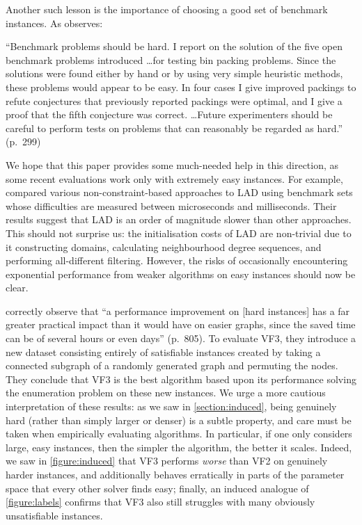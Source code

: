 \documentclass[twoside,11pt]{article}
\begin{document}
Another such lesson is the importance of choosing a good set of benchmark instances. As
 observes:

\begin{displayquote}
    ``Benchmark problems should be hard. I report on the solution of the five open benchmark
    problems introduced \ldots for testing bin packing problems. Since the solutions were found
    either by hand or by using very simple heuristic methods, these problems would appear to be
    easy. In four cases I give improved packings to refute conjectures that previously reported
    packings were optimal, and I give a proof that the fifth conjecture was correct. \ldots Future
    experimenters should be careful to perform tests on problems that can reasonably be regarded as
    hard.'' (p.\ 299)
\end{displayquote}

We hope that this paper provides some much-needed help in this direction, as some recent
evaluations work only with extremely easy instances. For example, 
compared various non-constraint-based approaches to LAD using benchmark sets whose
difficulties are measured between microseconds and milliseconds. Their results suggest that LAD is
an order of magnitude slower than other approaches. This should not surprise us: the initialisation
costs of LAD are non-trivial due to it constructing domains, calculating neighbourhood degree
sequences, and performing all-different filtering. However, the risks of occasionally encountering
exponential performance from weaker algorithms on easy instances should now be clear.

 correctly observe that ``a performance improvement on [hard instances] has a
far greater practical impact than it would have on easier graphs, since the saved time can be of
several hours or even days'' (p.\ 805). To evaluate VF3, they introduce a new dataset consisting
entirely of satisfiable instances created by taking a connected subgraph of a randomly generated
graph and permuting the nodes. They conclude that VF3 is the best algorithm based upon its
performance solving the enumeration problem on these new instances.  We urge a more cautious
interpretation of these results: as we saw in \cref{section:induced}, being genuinely hard (rather
than simply larger or denser) is a subtle property, and care must be taken when empirically
evaluating algorithms. In particular, if one only considers large, easy instances, then the simpler
the algorithm, the better it scales. Indeed, we saw in \cref{figure:induced} that VF3 performs
\emph{worse} than VF2 on genuinely harder instances, and additionally behaves erratically in parts
of the parameter space that every other solver finds easy; finally, an induced analogue of
\cref{figure:labels} confirms that VF3 also still struggles with many obviously unsatisfiable
instances.
\end{document}
